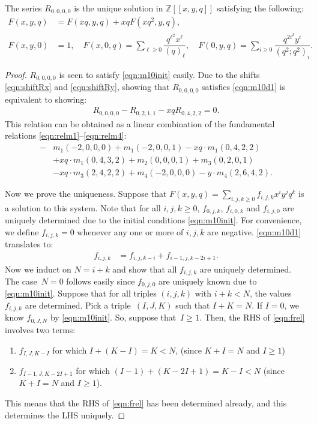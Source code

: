 \documentclass[ALCO,Unicode,published]{cedram}
\newcommand{\ZZ}{\mathbb{Z}}
\begin{document}
\begin{thm}
The series $R_{0,0,0,0}$ is the unique solution in $\ZZ[[x,y,q]]$ satisfying
the following:
\begin{align}
F(x,y,q) &= F(xq,y,q) + xqF\left(xq^2,y,q\right) \label{eqn:m10d1},\\
F(x,y,0) &= 1,\quad 
F(x,0,q) = \sum_{\ell\geq 0}\dfrac{q^{\ell^2}x^\ell}{(q)_\ell},\quad 
F(0,y,q) = \sum_{i\geq 0}\dfrac{q^{2i^2}y^i}{(q^2;q^2)_i}. \label{eqn:m10init}
\end{align}
\end{thm}
\begin{proof}
$R_{0,0,0,0}$ is seen to satisfy \eqref{eqn:m10init} easily.
Due to the shifts \eqref{eqn:shiftRx} and \eqref{eqn:shiftRy}, showing that $R_{0,0,0,0}$ satisfies
\eqref{eqn:m10d1} is equivalent to showing:
\begin{align}
R_{0,0,0,0} - R_{0,2,1,1} - xqR_{0,4,2,2} = 0.
\end{align}
This relation can be obtained as a linear combination of the fundamental relations \eqref{eqn:relm1}--\eqref{eqn:relm4}:
\begin{align}
-&m_1(-2,0,0,0)+m_1(-2,0,0,1)-xq\cdot m_1(0,4,2,2)
\nonumber\\
&+xq\cdot m_1(0,4,3,2)+m_2(0,0,0,1)+m_3(0,2,0,1)
\nonumber \\
&-xq\cdot m_3(2,4,2,2)+m_4(-2,0,0,0)-y\cdot m_4(2,6,4,2).
\end{align}

Now we prove the uniqueness. 
Suppose that $F(x,y,q)=\sum_{i,j,k\geq 0}f_{i,j,k}x^iy^jq^k$ is a solution to this system.
Note that for all $i,j,k\geq 0$, $f_{0,j,k}$, $f_{i,0,k}$ and $f_{i,j,0}$ 
are uniquely determined due to the initial conditions 
\eqref{eqn:m10init}.
For convenience, we define $f_{i,j,k}=0$ whenever any one or more of $i,j,k$ are negative.
\eqref{eqn:m10d1} translates to:
\begin{align}
f_{i,j,k}&=f_{i,j,k-i}+f_{i-1,j,k-2i+1}.
\label{eqn:frel}
\end{align}
Now we induct on $N=i+k$ and show that all $f_{i,j,k}$ are uniquely determined.
The case~$N=0$ follows easily since $f_{0,j,0}$ are uniquely known due to \eqref{eqn:m10init}.
Suppose that for all triples $(i,j,k)$ with $i+k<N$, the values $f_{i,j,k}$ are determined.
Pick a triple~$(I,J,K)$ such that $I+K=N$. 
If $I=0$, we know $f_{0,J,N}$ by \eqref{eqn:m10init}.
So, suppose that~$I\geq 1$. 
Then, the RHS of \eqref{eqn:frel} involves two terms:
\begin{enumerate}
\item $f_{I,J,K-I}$ for which $I+(K-I) = K < N$, (since $K+I=N$ and $I\geq 1$)
\item $f_{I-1,J,K-2I+1}$ for which $(I-1)+(K-2I+1) = K - I < N$ (since $K+I=N$ and $I\geq 1$).
\end{enumerate}
This means that the RHS of \eqref{eqn:frel} has been determined already, and this determines
the LHS uniquely.
\end{proof}
\end{document}
